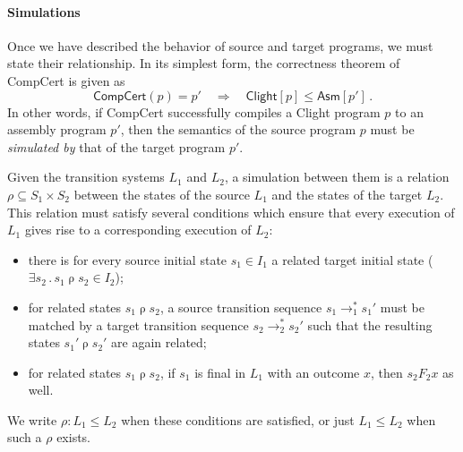 \documentclass[acmsmall,screen,review,anonymous]{acmart}
\newcommand{\kw}[1]{\ensuremath{ \mathsf{#1} }}
\begin{document}

\paragraph{Simulations}

Once we have described
the behavior of source and target programs,
we must state their relationship.
In its simplest form,
the correctness theorem of CompCert is given as
\begin{equation}
    \kw{CompCert}(p) = p'
    \quad\Longrightarrow\quad
    \kw{Clight}[p] \le \kw{Asm}[p']
    \,.
    \label{eqn:ccc-wp}
\end{equation}
In other words,
if CompCert successfully compiles a Clight program $p$
to an assembly program $p'$,
then the semantics of the source program $p$
must be \emph{simulated by}
that of the target program $p'$.

Given the transition systems $L_1$ and $L_2$,
a simulation between them is a relation $\rho \subseteq S_1 \times S_2$
between the states of the source $L_1$
and the states of the target $L_2$.
This relation must satisfy several conditions
which ensure that
every execution of $L_1$ gives rise
to a corresponding execution of $L_2$:
\begin{itemize}
  \item there is for every source initial state $s_1 \in I_1$
    a related target initial state
    ($\exists s_2 \mathbin. s_1 \mathrel\rho s_2 \in I_2$);
  \item for related states $s_1 \mathrel\rho s_2$,
    a source transition sequence $s_1 \rightarrow_1^* s_1'$ must be matched by
    a target transition sequence $s_2 \rightarrow_2^* s_2'$ such that
    the resulting states $s_1' \mathrel\rho s_2'$ are again related;
  \item for related states $s_1 \mathrel\rho s_2$,
    if $s_1$ is final in $L_1$ with an outcome $x$,
    then $s_2 \mathrel{F_2} x$ as well.
\end{itemize}
We write $\rho : L_1 \le L_2$ when these conditions are satisfied,
or just $L_1 \le L_2$ when such a $\rho$ exists.
\end{document}
